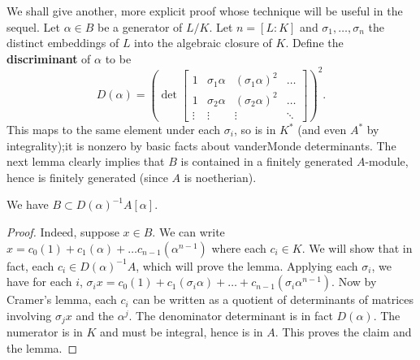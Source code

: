 We shall give another, more explicit proof whose technique will be useful in the sequel.
Let $\alpha  \in B$ be a generator of $L/K$.  Let $n=[L:K]$ and $\sigma_1, \dots, \sigma_n$ the distinct embeddings of $L$ into the algebraic closure of $K$.
Define the \textbf{discriminant} of $\alpha$ to be
\[ D(\alpha) = \left(\det \begin{bmatrix} 
1 & \sigma_1\alpha & (\sigma_1 \alpha)^2 & \dots \\
1 & \sigma_2\alpha & (\sigma_2 \alpha)^2 & \dots \\
\vdots & \vdots & \vdots & \ddots \end{bmatrix}\right)^2 .\]
This maps to the same element under each $\sigma_i$, so is in $K^*$ (and even $A^*$ by integrality);it is nonzero by basic facts about vanderMonde determinants.  The  next lemma clearly implies that $B$ is contained in a finitely generated $A$-module, hence is finitely generated (since $A$ is noetherian).
\begin{lemma} We have $B \subset D(\alpha)^{-1} A[\alpha]$. 
\end{lemma}
\begin{proof}
Indeed, suppose $x \in B$.  We can write $x = c_0 (1) + c_1 (\alpha) + \dots c_{n-1}(\alpha^{n-1})$ where each $c_i \in K$.  We will show that in fact, each $c_i \in D(\alpha)^{-1}A$, which will prove the lemma.  Applying each $\sigma_i$, we have for each $i$, $\sigma_i x = c_0 (1) + c_1 (\sigma_i \alpha) + \dots + c_{n-1} ( \sigma_i \alpha^{n-1})$.
Now by Cramer's lemma, each $c_i$ can be written as a quotient of determinants of matrices involving $\sigma_jx $ and the $\alpha^{j}$.  The denominator determinant is in fact $D(\alpha)$.  The numerator is in $K$ and must be integral, hence is in $A$.  This proves the claim and the lemma.
\end{proof}

